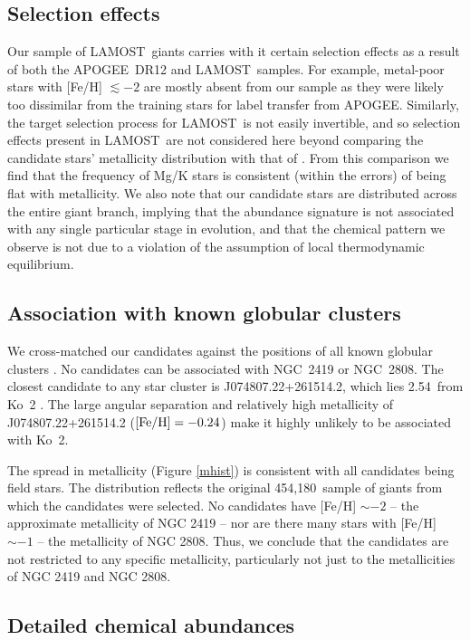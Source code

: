 \documentclass[a4paper,fleqn,usenatbib]{mnras}
\newcommand{\LamostGiants}{454,180}
\newcommand{\project}[1]{#1}
\newcommand{\lamost}{\project{LAMOST}}
\newcommand{\apogee}{\project{APOGEE}}
\begin{document}
\subsection{Selection effects}
\label{sec:selectioneffects}

Our sample of \lamost\ giants carries with it certain selection effects as a result of both the \apogee\ DR12 and \lamost\ samples. For example, metal-poor stars with [Fe/H] $\lesssim-2$ are mostly absent from our sample as they were likely too dissimilar from the training stars for label transfer from \apogee. Similarly, the target selection process for \lamost\ is not easily invertible, and so selection effects present in \lamost\ are not considered here beyond comparing the candidate stars' metallicity distribution with that of \cite{ho2017}. From this comparison we find that the frequency of Mg/K stars is consistent (within the errors) of being flat with metallicity. We also note that  our candidate stars are distributed across the entire giant branch, implying that the abundance signature is not associated with any single particular stage in evolution, and that the chemical pattern we observe is not due to a violation of the assumption of local thermodynamic equilibrium.

\subsection{Association with known globular clusters}
\label{sec:globclustasoc}
We cross-matched our candidates against the positions of all known globular clusters \citep{harris1996}. No candidates can be associated with NGC~2419 or NGC~2808. The closest candidate to any star cluster is J074807.22+261514.2, which lies 2.54\degree\ from Ko~2 \citep{koposov2007}. The large angular separation and relatively  high metallicity of J074807.22+261514.2 ($[{\rm Fe}/{\rm H}] = -0.24$) make it highly unlikely to be associated with Ko~2. 

The spread in metallicity (Figure \ref{mhist}) is consistent with all candidates being field stars. The distribution reflects the original \LamostGiants\ sample of giants from which the candidates were selected.
No candidates have [Fe/H] $\sim -2$ -- the approximate metallicity of NGC 2419 -- nor are there many stars with [Fe/H] $\sim -1$ -- the metallicity of NGC 2808. Thus, we conclude that the candidates are not restricted to any specific metallicity, particularly not just to the metallicities of NGC 2419 and NGC 2808.


\subsection{Detailed chemical abundances}
\label{sec:abundances}
\end{document}
